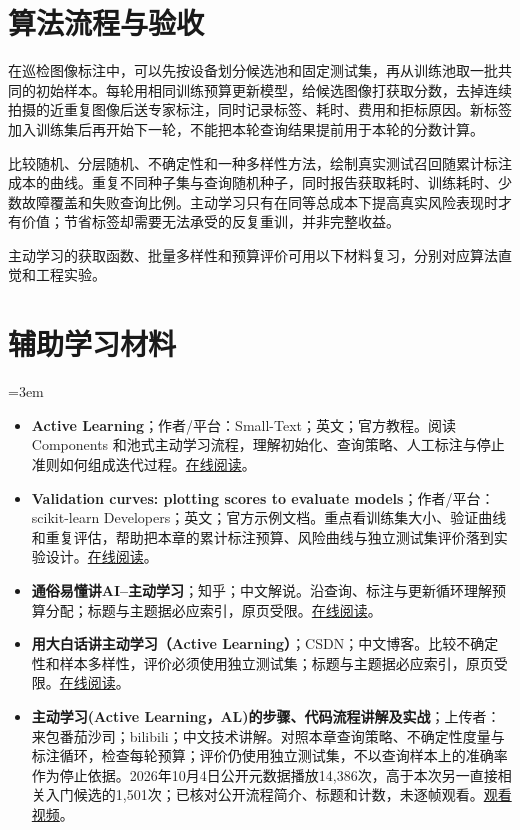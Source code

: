 \section{算法流程与验收}
在巡检图像标注中，可以先按设备划分候选池和固定测试集，再从训练池取一批共同的初始样本。每轮用相同训练预算更新模型，给候选图像打获取分数，去掉连续拍摄的近重复图像后送专家标注，同时记录标签、耗时、费用和拒标原因。新标签加入训练集后再开始下一轮，不能把本轮查询结果提前用于本轮的分数计算。

比较随机、分层随机、不确定性和一种多样性方法，绘制真实测试召回随累计标注成本的曲线。重复不同种子集与查询随机种子，同时报告获取耗时、训练耗时、少数故障覆盖和失败查询比例。主动学习只有在同等总成本下提高真实风险表现时才有价值；节省标签却需要无法承受的反复重训，并非完整收益。

主动学习的获取函数、批量多样性和预算评价可用以下材料复习，分别对应算法直觉和工程实验。
\section*{辅助学习材料}
\begingroup
\emergencystretch=3em
\begin{itemize}
\item \textbf{Active Learning}；作者/平台：Small-Text；英文；官方教程。阅读 Components 和池式主动学习流程，理解初始化、查询策略、人工标注与停止准则如何组成迭代过程。\href{https://small-text.readthedocs.io/en/latest/active\_learning.html}{在线阅读}。
\item \textbf{Validation curves: plotting scores to evaluate models}；作者/平台：scikit-learn Developers；英文；官方示例文档。重点看训练集大小、验证曲线和重复评估，帮助把本章的累计标注预算、风险曲线与独立测试集评价落到实验设计。\href{https://scikit-learn.org/stable/modules/learning\_curve.html}{在线阅读}。
\item \textbf{通俗易懂讲AI--主动学习}；知乎；中文解说。沿查询、标注与更新循环理解预算分配；标题与主题据必应索引，原页受限。\href{https://zhuanlan.zhihu.com/p/676122996}{在线阅读}。
\item \textbf{用大白话讲主动学习（Active Learning）}；CSDN；中文博客。比较不确定性和样本多样性，评价必须使用独立测试集；标题与主题据必应索引，原页受限。\href{https://blog.csdn.net/qq\_51323826/article/details/144357831}{在线阅读}。
\item \textbf{主动学习(Active Learning，AL)的步骤、代码流程讲解及实战}；上传者：来包番茄沙司；bilibili；中文技术讲解。对照本章查询策略、不确定性度量与标注循环，检查每轮预算；评价仍使用独立测试集，不以查询样本上的准确率作为停止依据。2026年10月4日公开元数据播放14,386次，高于本次另一直接相关入门候选的1,501次；已核对公开流程简介、标题和计数，未逐帧观看。\href{https://www.bilibili.com/video/BV1y34y147xN/}{观看视频}。
\end{itemize}
\endgroup

